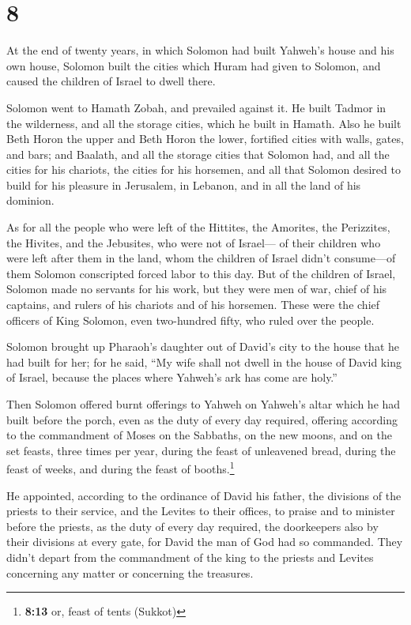 \hypertarget{section-7}{%
\section{8}\label{section-7}}

 At the end of twenty years, in which Solomon had built
Yahweh's house and his own house,  Solomon built the
cities which Huram had given to Solomon, and caused the children of
Israel to dwell there.

 Solomon went to Hamath Zobah, and prevailed against it.
 He built Tadmor in the wilderness, and all the storage
cities, which he built in Hamath.  Also he built Beth
Horon the upper and Beth Horon the lower, fortified cities with walls,
gates, and bars;  and Baalath, and all the storage cities
that Solomon had, and all the cities for his chariots, the cities for
his horsemen, and all that Solomon desired to build for his pleasure in
Jerusalem, in Lebanon, and in all the land of his dominion.

 As for all the people who were left of the Hittites, the
Amorites, the Perizzites, the Hivites, and the Jebusites, who were not
of Israel---  of their children who were left after them
in the land, whom the children of Israel didn't consume---of them
Solomon conscripted forced labor to this day.  But of the
children of Israel, Solomon made no servants for his work, but they were
men of war, chief of his captains, and rulers of his chariots and of his
horsemen.  These were the chief officers of King Solomon,
even two-hundred fifty, who ruled over the people.

 Solomon brought up Pharaoh's daughter out of David's
city to the house that he had built for her; for he said, ``My wife
shall not dwell in the house of David king of Israel, because the places
where Yahweh's ark has come are holy.''

 Then Solomon offered burnt offerings to Yahweh on
Yahweh's altar which he had built before the porch,  even
as the duty of every day required, offering according to the commandment
of Moses on the Sabbaths, on the new moons, and on the set feasts, three
times per year, during the feast of unleavened bread, during the feast
of weeks, and during the feast of booths.\footnote{\textbf{8:13} or,
  feast of tents (Sukkot)}

 He appointed, according to the ordinance of David his
father, the divisions of the priests to their service, and the Levites
to their offices, to praise and to minister before the priests, as the
duty of every day required, the doorkeepers also by their divisions at
every gate, for David the man of God had so commanded. 
They didn't depart from the commandment of the king to the priests and
Levites concerning any matter or concerning the treasures.

